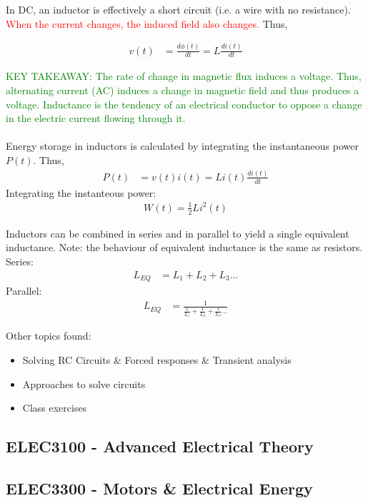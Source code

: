 In DC, an inductor is effectively a short circuit (i.e. a wire with no resistance). \textcolor{red}{When the current changes, the induced field also changes.} Thus,

\begin{align}
  v(t) &= \frac{d\phi(t)}{dt} = L \frac{di(t)}{dt}
\end{align}

\textcolor{green}{KEY TAKEAWAY: The rate of change in magnetic flux induces a voltage. Thus, alternating current (AC) induces a change in magnetic field and thus produces a voltage. Inductance is the tendency of an electrical conductor to oppose a change in the electric current flowing through it.}\\
\\
Energy storage in inductors is calculated by integrating the instantaneous power $P(t)$. Thus,
\begin{align}
  P(t) &= v(t)i(t) = Li(t)\frac{di(t)}{dt}
\end{align}
Integrating the instanteous power:
\begin{align}
  W(t) = \frac{1}{2}Li^2(t)
\end{align}

Inductors can be combined in series and in parallel to yield a single equivalent inductance. Note: the behaviour of equivalent inductance is the same as resistors. Series:
\begin{align}
  L_{EQ} &= L_1 + L_2 + L_3 ...
\end{align}
Parallel:
\begin{align}
  L_{EQ} &= \frac{1}{\frac{1}{L_1} + \frac{1}{L_2} + \frac{1}{L_3} ...}
\end{align}

Other topics found:
\begin{itemize}
  \item Solving RC Circuits & Forced responses & Transient analysis
  \item Approaches to solve circuits
  \item Class exercises
\end{itemize}
\clearpage

\subsection{ELEC3100 - Advanced Electrical Theory}
\clearpage

\subsection{ELEC3300 - Motors \& Electrical Energy}
\clearpage

